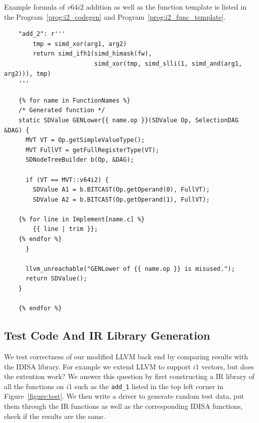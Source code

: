 Example formula of $v64i2$ addition as well as the function template is listed in the Program~\ref{prog:i2_codegen} and Program~\ref{prog:i2_func_template}.

\begin{program}[htbp!]
\begin{verbatim}
    "add_2": r'''
        tmp = simd_xor(arg1, arg2)
        return simd_ifh1(simd_himask(fw),
                         simd_xor(tmp, simd_slli(1, simd_and(arg1, arg2))), tmp)
    '''
\end{verbatim}
\caption[Minimum boolean function for $v64i2$ addition]{Minimum boolean function for $v64i2$ addition.}
\label{prog:i2_codegen}
\end{program}

\begin{program}[htbp!]
\begin{verbatim}
    {% for name in FunctionNames %}
    /* Generated function */
    static SDValue GENLower{{ name.op }}(SDValue Op, SelectionDAG &DAG) {
      MVT VT = Op.getSimpleValueType();
      MVT FullVT = getFullRegisterType(VT);
      SDNodeTreeBuilder b(Op, &DAG);

      if (VT == MVT::v64i2) {
        SDValue A1 = b.BITCAST(Op.getOperand(0), FullVT);
        SDValue A2 = b.BITCAST(Op.getOperand(1), FullVT);

    {% for line in Implement[name.c] %}
        {{ line | trim }};
    {% endfor %}
      }

      llvm_unreachable("GENLower of {{ name.op }} is misused.");
      return SDValue();
    }

    {% endfor %}
\end{verbatim}
\caption[Custom lowering function template for $v64i2$]{Custom lowering function template for $v64i2$. This template file generates one function for each operation.}
\label{prog:i2_func_template}
\end{program}

\subsection{Test Code And IR Library Generation}
We test correctness of our modified LLVM back end by comparing results with the IDISA library. For example we extend LLVM to support $i1$ vectors, but does the extention work? We answer this question by first constructing a IR library of all the functions on $i1$ such as the {\tt add\_1} listed in the top left corner in Figure~\ref{figure:test}. We then write a driver to generate random test data, put them through the IR functions as well as the corresponding IDISA functions, check if the results are the same.

